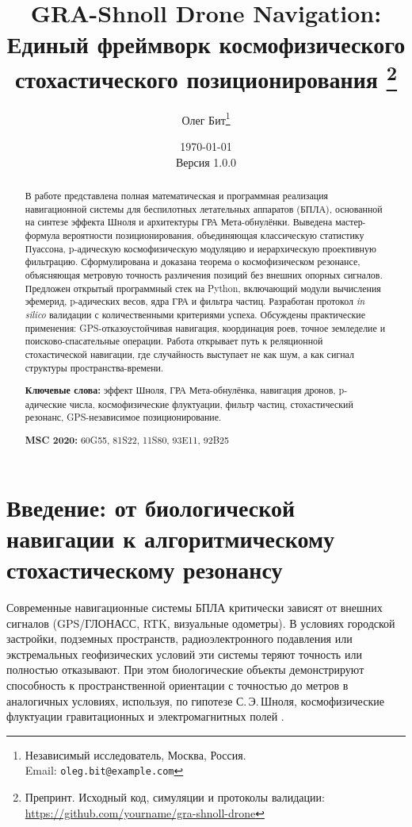 \documentclass[12pt,a4paper]{article}
\title{
    \textbf{GRA-Shnoll Drone Navigation: \\ Единый фреймворк космофизического стохастического позиционирования}
    \thanks{Препринт. Исходный код, симуляции и протоколы валидации: \url{https://github.com/yourname/gra-shnoll-drone}}
}
\author{
    Олег Бит\thanks{Независимый исследователь, Москва, Россия. \\
    Email: \texttt{oleg.bit@example.com}}
}
\date{
    \today \\
    \small{Версия 1.0.0}
}
\theoremstyle{plain}
\theoremstyle{definition}
\begin{document}
\maketitle

\begin{abstract}
\noindent
В работе представлена полная математическая и программная реализация навигационной системы для беспилотных летательных аппаратов (БПЛА), основанной на синтезе эффекта Шноля и архитектуры ГРА Мета-обнулёнки. Выведена мастер-формула вероятности позиционирования, объединяющая классическую статистику Пуассона, p-адическую космофизическую модуляцию и иерархическую проективную фильтрацию. Сформулирована и доказана теорема о космофизическом резонансе, объясняющая метровую точность различения позиций без внешних опорных сигналов. Предложен открытый программный стек на Python, включающий модули вычисления эфемерид, p-адических весов, ядра ГРА и фильтра частиц. Разработан протокол \textit{in silico} валидации с количественными критериями успеха. Обсуждены практические применения: GPS-отказоустойчивая навигация, координация роев, точное земледелие и поисково-спасательные операции. Работа открывает путь к реляционной стохастической навигации, где случайность выступает не как шум, а как сигнал структуры пространства-времени.

\medskip
\noindent\textbf{Ключевые слова:} эффект Шноля, ГРА Мета-обнулёнка, навигация дронов, p-адические числа, космофизические флуктуации, фильтр частиц, стохастический резонанс, GPS-независимое позиционирование.

\medskip
\noindent\textbf{MSC 2020:} 60G55, 81S22, 11S80, 93E11, 92B25
\end{abstract}

\section{Введение: от биологической навигации к алгоритмическому стохастическому резонансу}
\label{sec:intro}

Современные навигационные системы БПЛА критически зависят от внешних сигналов (GPS/ГЛОНАСС, RTK, визуальные одометры). В условиях городской застройки, подземных пространств, радиоэлектронного подавления или экстремальных геофизических условий эти системы теряют точность или полностью отказывают. При этом биологические объекты демонстрируют способность к пространственной ориентации с точностью до метров в аналогичных условиях, используя, по гипотезе С.\,Э.\,Шноля, космофизические флуктуации гравитационных и электромагнитных полей \cite{shnoll2009patterns,rubin2004cosmophysical}.
\end{document}
